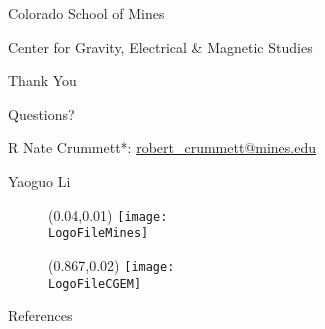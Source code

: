 \documentclass[dark]{cgem-presentation}
\begin{document}
\begin{frame}[plain]
	\begin{center}
		{ \color{SecondColor}
		\vspace{1mm}
		\small
		Colorado School of Mines

		\vspace{2mm}
		\Large
		Center for Gravity, Electrical \& Magnetic Studies
		}

		\vspace{-1mm}

		\vspace{1.5cm}
		\LARGE
		Thank You

		Questions?

		\vspace{1.95cm}

		\vspace{-8mm}
		{ \color{SecondColor}
		\normalsize
		R Nate Crummett*: \href{robert\_crummett@mines.edu}{robert\_crummett@mines.edu}

		\vspace{-3mm}
		Yaoguo Li
		}
	\end{center}

	\begin{figure}
		\begin{textblock*}{1.5cm}(0.04\paperwidth,0.01\paperheight)
			\texttt{[image: \\LogoFileMines]}
		\end{textblock*}
	\end{figure}

	\begin{figure}
		\vspace*{-19.00015pt}
		\begin{textblock*}{1.35cm}(0.867\paperwidth,0.02\paperheight)
			\texttt{[image: \\LogoFileCGEM]}
		\end{textblock*}
	\end{figure}

\end{frame}

\begin{frame}{References}
	\printbibliography
\end{frame}
\end{document}

